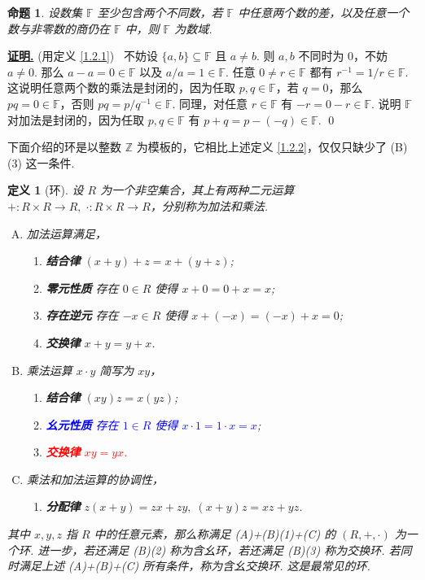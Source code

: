 \documentclass[10pt,openany]{article}
\theoremstyle{thmstyle} %
\theoremstyle{defstyle} %
\newtheorem{definition}[theorem]{定义}
\theoremstyle{prostyle} %
\newtheorem{proposition}[theorem]{命题}
\theoremstyle{exastyle}
\theoremstyle{remstyle}
\renewenvironment{proof}[1][证明]{\par\underline{\textbf{#1.}} \;\fangsong}{\qed\par}
\newcommand{\F}{\mathbb{F}}
\begin{document}
\begin{proposition}
	设数集 \( \F \) 至少包含两个不同数，若 \( \F \) 中任意两个数的差，以及任意一个数与非零数的商仍在 \( \F \) 中，则 \( \F \) 为数域.
\end{proposition}

\begin{proof}
	(用定义 \ref{1.2.1}) \ 不妨设 \( \{a,b\} \subseteq \F \) 且 \( a \neq b \). 则 \( a,b \) 不同时为 \( 0 \)，不妨 \( a \neq 0 \). 那么 \( a-a=0 \in \F \) 以及 \( a/a=1 \in \F \). 任意 \( 0 \neq r \in \F \) 都有 \( r^{-1}=1/r \in \F \). 这说明任意两个数的乘法是封闭的，因为任取 \( p,q \in \F \)，若 \( q=0 \)，那么 \( pq=0 \in \F \)，否则 \( pq=p/q^{-1} \in \F \). 同理，对任意 \( r \in \F \) 有 \( -r=0-r \in \F \). 说明 \( \F \) 对加法是封闭的，因为任取 \( p,q \in \F \) 有 \( p+q=p-(-q) \in \F \).
\end{proof}

\vspace{2ex}

下面介绍的环是以整数 \( \mathbb{Z} \) 为模板的，它相比上述定义 \ref{1.2.2}，仅仅只缺少了 (B)(3) 这一条件. 

\begin{definition}[环]
	设 \( R \) 为一个非空集合，其上有两种二元运算 \( +:R \times R \to R , \; \cdot : R \times R \to R \)，分别称为加法和乘法.
	\begin{enumerate}[(A)]
		\item 加法运算满足，
		\begin{enumerate}[(1)]
			\item \textbf{结合律} \( (x+y)+z=x+(y+z) \);
			\item \textbf{零元性质} 存在 \( 0 \in R \) 使得 \( x+0=0+x=x \);
			\item \textbf{存在逆元} 存在 \( -x \in R \) 使得 \( x+(-x)=(-x)+x=0 \);
			\item \textbf{交换律} \( x+y=y+x \).
		\end{enumerate}
		\item 乘法运算 \( x \cdot y \) 简写为 \( xy \)，
		\begin{enumerate}[(1)]
			\item \textbf{结合律} \( (xy)z=x(yz) \);
			\item \textcolor{blue}{\textbf{幺元性质} 存在 \( 1 \in R \) 使得 \( x \cdot 1=1 \cdot x=x \)};
			\item \textcolor{red}{\textbf{交换律} \( xy=yx \).}
		\end{enumerate}
		\item 乘法和加法运算的协调性，
		\begin{enumerate}[(1)]
			\item \textbf{分配律} \( z(x+y)=zx+zy, \; (x+y)z=xz+yz \).
		\end{enumerate}
	\end{enumerate}
	
	其中 \( x,y,z \) 指 \( R \) 中的任意元素，那么称满足 (A)+(B)(1)+(C) 的 \( (R,+, \cdot) \) 为一个环. 进一步，若还满足 (B)(2) 称为含幺环，若还满足 (B)(3) 称为交换环. 若同时满足上述 (A)+(B)+(C) 所有条件，称为含幺交换环. 这是最常见的环. 
	\label{}
\end{definition}
\end{document}
